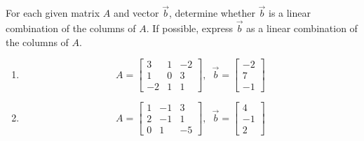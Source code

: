 \documentclass{ximera}
\begin{document}
\begin{example}\label{ex:linearcombofcols2}For each given matrix $A$ and vector $\vec{b}$, determine whether $\vec{b}$ is a linear combination of the columns of $A$.  If possible, express $\vec{b}$ as a linear combination of the columns of $A$.

  \begin{enumerate}
\item \label{item:linearcombofcols2a}
$$A=\begin{bmatrix}
3&1&-2\\
1&0&3\\
-2&1&1
\end{bmatrix},\,\,\,\vec{b}=\begin{bmatrix} -2\\7\\-1\end{bmatrix}$$

\item \label{item:linearcombofcols2b}
$$A=\begin{bmatrix}
1&-1&3\\
2&-1&1\\
0&1&-5
\end{bmatrix},\,\,\,\vec{b}=\begin{bmatrix} 4\\-1\\2\end{bmatrix}$$
\end{enumerate}


\end{example}
\end{document}
